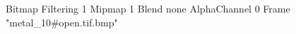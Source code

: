 {Bitmap
	{Filtering 1}
	{Mipmap 1}
	{Blend none}
	{AlphaChannel 0}
	{Frame "metal_10#open.tif.bmp"}
}

